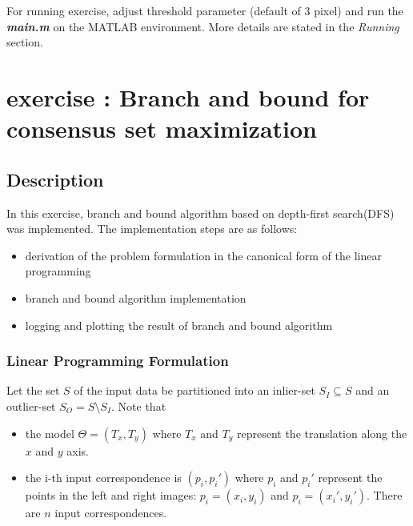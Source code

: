 \documentclass[paper=a4, fontsize=11pt]{scrartcl} %
\numberwithin{equation}{section} %
\numberwithin{figure}{section} %
\numberwithin{table}{section} %
\newcommand{\filename}[1]{\textbf{\textit{#1}}}
\begin{document}
For running exercise, adjust threshold parameter (default of 3 pixel) and run the \filename{main.m} on the MATLAB environment. More details are stated in the \textit{Running} section.


\section{exercise : Branch and bound for consensus set maximization}

\subsection{Description}

In this exercise, branch and bound algorithm based on depth-first search(DFS) was implemented. The implementation steps are as follows: 

\begin{itemize}
\item derivation of the problem formulation in the canonical form of the linear programming
\item branch and bound algorithm implementation
\item logging and plotting the result of branch and bound algorithm
\end{itemize}  

\subsubsection{Linear Programming Formulation}

Let the set $S$ of the input data be partitioned into an inlier-set $S_{I} \subseteq S$ and an outlier-set $S_{O} = S \setminus S_{I}$. Note that  

\begin{itemize}
\item the model $\Theta = (T_{x}, T_{y})$ where $T_{x}$ and $T_{y}$ represent the translation along the $x$ and $y$ axis.
\item the i-th input correspondence is $(p_{i}, p_{i}')$ where $p_{i}$ and $p_{i}'$ represent the points in the left and right images: $p_{i} = (x_{i}, y_{i})$ and $p_{i} = (x_{i}', y_{i}')$. There are $n$ input correspondences.
\end{itemize}
\end{document}
